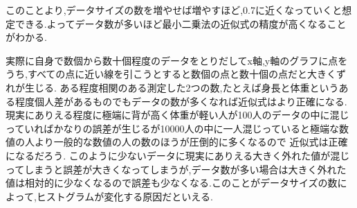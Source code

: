 \documentclass[a4j,10pt,dvipdfmx]{jarticle}
\begin{document}
このことより,データサイズの数を増やせば増やすほど,0.7に近くなっていくと想定できる.よってデータ数が多いほど最小二乗法の近似式の精度が高くなることがわかる.

実際に自身で数個から数十個程度のデータをとりだしてx軸,y軸のグラフに点をうち,すべての点に近い線を引こうとすると数個の点と数十個の点だと大きくずれが生じる.
ある程度相関のある測定した2つの数,たとえば身長と体重というある程度個人差があるものでもデータの数が多くなれば近似式はより正確になる.
現実にありえる程度に極端に背が高く体重が軽い人が100人のデータの中に混じっていればかなりの誤差が生じるが10000人の中に一人混じっていると極端な数値の人より一般的な数値の人の数のほうが圧倒的に多くなるので
近似式は正確になるだろう.
このように少ないデータに現実にありえる大きく外れた値が混じってしまうと誤差が大きくなってしまうが,データ数が多い場合は大きく外れた値は相対的に少なくなるので誤差も少なくなる.このことがデータサイズの数によって,ヒストグラムが変化する原因だといえる.
\end{document}
